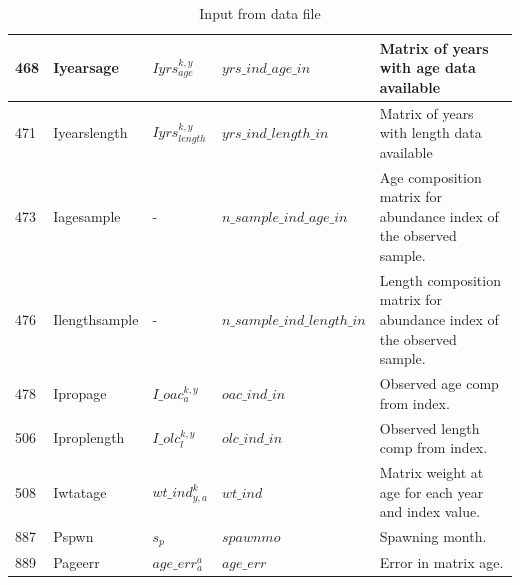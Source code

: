 \documentclass{article}
\begin{document}
\begin{table}[H]
\begin{tabular}{||  p{0.5cm} | p{1.9cm}  | p{1.9cm} | l | p{7cm} ||}
468 &  Iyearsage       & $Iyrs^{k,y}_{age}$           & $yrs\_ind\_age\_in$ & Matrix of years with age data available\\ \hline
471 &  Iyearslength    &  $Iyrs^{k,y}_{length}$           & $yrs\_ind\_length\_in$ & Matrix of years with length data available\\ \hline
473 &  Iagesample      & -            & $n\_sample\_ind\_age\_in$ & Age composition matrix for abundance index of the observed sample.\\ \hline
476 &  Ilengthsample   &   -          & $n\_sample\_ind\_length\_in$ & Length composition matrix for abundance index of the observed sample.\\ \hline
478 &  Ipropage        &  $I\_oac^{k,y}_a$          & $oac\_ind\_in$ & Observed age comp from index. \\ \hline
506 &  Iproplength     & $I\_olc^{k,y}_l$            & $olc\_ind\_in$ & Observed length comp from index.\\ \hline
508 &  Iwtatage        & $wt\_ind^k_{y,a}$  & $wt\_ind$ & Matrix weight at age for each year and index value. \\ \hline
887 &  Pspwn           &  $s_p$             & $spawnmo$ & Spawning month.\\ \hline
889 &  Pageerr         & $age\_err^a_a$     & $age\_err$ & Error in matrix age.\\ \hline
\end{tabular} 
\newpage
    \caption{Input from data file}
    \label{tab:my_label}
\end{table}
\end{document}
